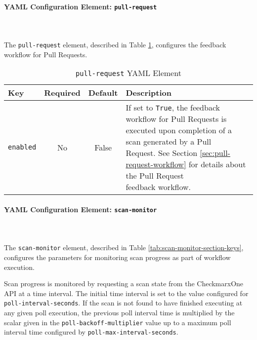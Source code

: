 \paragraph{YAML Configuration Element: \texttt{pull-request} }\label{sec:pull-request-element}

\noindent\\\\The \texttt{pull-request} element, described in 
Table \ref{tab:pull-request-section-keys}, configures the feedback workflow for
Pull Requests.

\begin{table}[ht]
    \caption{\texttt{pull-request} YAML Element}  
    \label{tab:pull-request-section-keys}      
    \begin{tabularx}{\textwidth}{lccl}
        \toprule
        \textbf{Key} & \textbf{Required} & \textbf{Default} & \textbf{Description}\\
        \midrule
        \texttt{enabled} & No & False & \makecell[l]{If set to \texttt{True}, the feedback
        workflow for Pull Requests is\\executed upon completion of a scan generated by
        a Pull\\Request. See Section \ref{sec:pull-request-workflow} for details about
        the Pull Request\\feedback workflow.}\\
        \bottomrule
    \end{tabularx}
\end{table}

\paragraph{YAML Configuration Element: \texttt{scan-monitor} }\label{sec:scan-monitor-element}

\noindent\\\\The \texttt{scan-monitor} element, described in 
Table \ref{tab:scan-monitor-section-keys}, configures the parameters for monitoring scan
progress as part of workflow execution.

Scan progress is monitored by requesting a scan state from the CheckmarxOne API at
a time interval.  The initial time interval is set to the value configured for
\texttt{poll-interval-seconds}.  If the scan is not found to have finished executing
at any given poll execution, the previous poll interval time is multiplied by
the scalar given in the \texttt{poll-backoff-multiplier} value up to a maximum
poll interval time configured by \texttt{poll-max-interval-seconds}.

